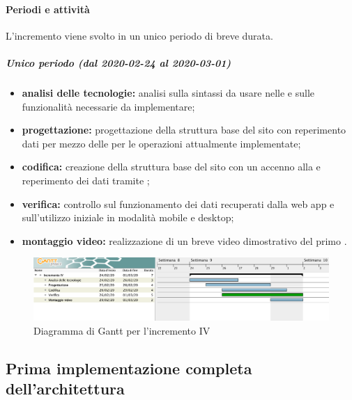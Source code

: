 			\paragraph{Periodi e attività}
			
				L'incremento viene svolto in un unico periodo di breve durata.
				
				\subparagraph{Unico periodo (dal 2020-02-24 al 2020-03-01)}
				
					\begin{itemize}
						\item \textbf{analisi delle tecnologie:} analisi sulla sintassi da usare nelle  e sulle funzionalità necessarie da implementare;	
						\item \textbf{progettazione:} progettazione della struttura base del sito con reperimento dati per mezzo delle  per le operazioni attualmente implementate;
						\item \textbf{codifica:} creazione della struttura base del sito con un accenno alla  e reperimento dei dati tramite ;
						\item \textbf{verifica:} controllo sul funzionamento dei dati recuperati dalla web app e sull'utilizzo iniziale in modalità mobile e desktop;
						\item \textbf{montaggio video:} realizzazione di un breve video dimostrativo del primo .
					\end{itemize} 			

		\begin{landscape}
          \begin{figure}[H]
            \centering
            \includegraphics[width=\linewidth]{images/gantt/incrementoIV} %
            \caption{Diagramma di Gantt per l'incremento IV}
          \end{figure}		
		\end{landscape}

		
		\subsection{Prima implementazione completa dell'architettura}
		
